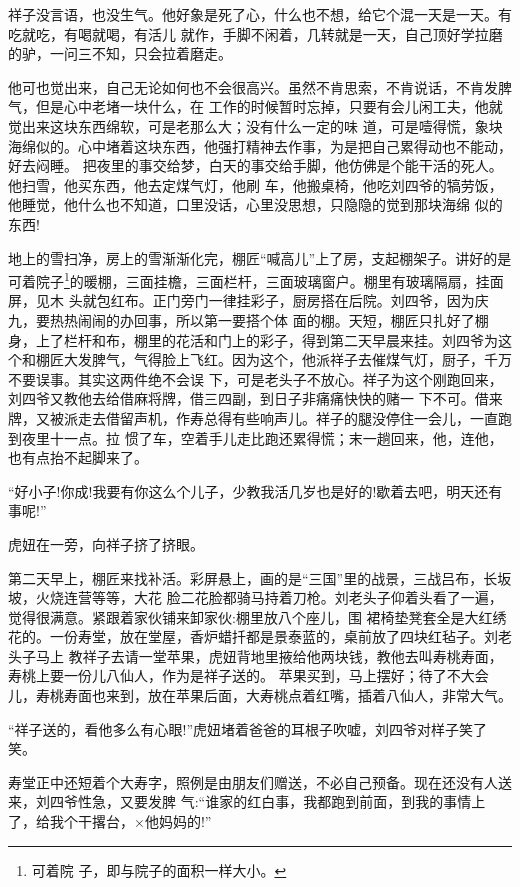 \documentclass[11pt,a4paper,onecolumn]{article}
\begin{document}
祥子没言语，也没生气。他好象是死了心，什么也不想，给它个混一天是一天。有吃就吃，有喝就喝，有活儿
就作，手脚不闲着，几转就是一天，自己顶好学拉磨的驴，一问三不知，只会拉着磨走。

他可也觉出来，自己无论如何也不会很高兴。虽然不肯思索，不肯说话，不肯发脾气，但是心中老堵一块什么，在
工作的时候暂时忘掉，只要有会儿闲工夫，他就觉出来这块东西\myrule 绵软，可是老那么大；没有什么一定的味
道，可是噎得慌，象块海绵似的。心中堵着这块东西，他强打精神去作事，为是把自己累得动也不能动，好去闷睡。
把夜里的事交给梦，白天的事交给手脚，他仿佛是个能干活的死人。他扫雪，他买东西，他去定煤气灯，他刷
车，他搬桌椅，他吃刘四爷的犒劳饭，他睡觉，他什么也不知道，口里没话，心里没思想，只隐隐的觉到那块海绵
似的东西!

地上的雪扫净，房上的雪渐渐化完，棚匠``喊高儿''上了房，支起棚架子。讲好的是可着院子\footnote{可着院
  子，即与院子的面积一样大小。}的暖棚，三面挂檐，三面栏杆，三面玻璃窗户。棚里有玻璃隔扇，挂面屏，见木
头就包红布。正门旁门一律挂彩子，厨房搭在后院。刘四爷，因为庆九，要热热闹闹的办回事，所以第一要搭个体
面的棚。天短，棚匠只扎好了棚身，上了栏杆和布，棚里的花活和门上的彩子，得到第二天早晨来挂。刘四爷为这
个和棚匠大发脾气，气得脸上飞红。因为这个，他派祥子去催煤气灯，厨子，千万不要误事。其实这两件绝不会误
下，可是老头子不放心。祥子为这个刚跑回来，刘四爷又教他去给借麻将牌，借三四副，到日子非痛痛快快的赌一
下不可。借来牌，又被派走去借留声机，作寿总得有些响声儿。祥子的腿没停住一会儿，一直跑到夜里十一点。拉
惯了车，空着手儿走比跑还累得慌；末一趟回来，他，连他，也有点抬不起脚来了。

``好小子!你成!我要有你这么个儿子，少教我活几岁也是好的!歇着去吧，明天还有事呢!''

虎妞在一旁，向祥子挤了挤眼。

第二天早上，棚匠来找补活。彩屏悬上，画的是``三国''里的战景，三战吕布，长坂坡，火烧连营等等，大花
脸二花脸都骑马持着刀枪。刘老头子仰着头看了一遍，觉得很满意。紧跟着家伙铺来卸家伙:棚里放八个座儿，围
裙椅垫凳套全是大红绣花的。一份寿堂，放在堂屋，香炉蜡扦都是景泰蓝的，桌前放了四块红毡子。刘老头子马上
教祥子去请一堂苹果，虎妞背地里掖给他两块钱，教他去叫寿桃寿面，寿桃上要一份儿八仙人，作为是祥子送的。
苹果买到，马上摆好；待了不大会儿，寿桃寿面也来到，放在苹果后面，大寿桃点着红嘴，插着八仙人，非常大气。

``祥子送的，看他多么有心眼!''虎妞堵着爸爸的耳根子吹嘘，刘四爷对样子笑了笑。

寿堂正中还短着个大寿字，照例是由朋友们赠送，不必自己预备。现在还没有人送来，刘四爷性急，又要发脾
气:``谁家的红白事，我都跑到前面，到我的事情上了，给我个干撂台，×他妈妈的!''
\end{document}
